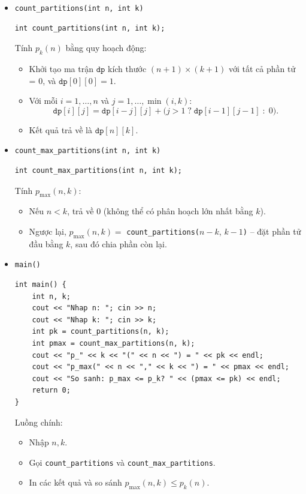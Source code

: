 \documentclass[a4paper,12pt]{article}
\begin{document}
\begin{itemize}

  \item \texttt{count\_partitions(int n, int k)}  
    \begin{lstlisting}[style=cppstyle]
int count_partitions(int n, int k);
    \end{lstlisting}
    Tính \(p_k(n)\) bằng quy hoạch động:
    \begin{itemize}
      \item Khởi tạo ma trận \(\texttt{dp}\) kích thước \((n+1)\times(k+1)\) với tất cả phần tử = 0, và \(\texttt{dp}[0][0]=1\).  
      \item Với mỗi \(i=1,\dots,n\) và \(j=1,\dots,\min(i,k)\):
        \[
          \texttt{dp}[i][j]
            = \texttt{dp}[i-j][j]
            + \bigl(j>1\;?\;\texttt{dp}[i-1][j-1]\;:\;0\bigr).
        \]
      \item Kết quả trả về là \(\texttt{dp}[n][k]\).
    \end{itemize}

  \item \texttt{count\_max\_partitions(int n, int k)}  
    \begin{lstlisting}[style=cppstyle]
int count_max_partitions(int n, int k);
    \end{lstlisting}
    Tính \(p_{\max}(n,k)\):
    \begin{itemize}
      \item Nếu \(n<k\), trả về 0 (không thể có phân hoạch lớn nhất bằng \(k\)).  
      \item Ngược lại, \(p_{\max}(n,k)=\) \texttt{count\_partitions(}\(n-k\), \(k-1\)\texttt{)} – đặt phần tử đầu bằng \(k\), sau đó chia phần còn lại.
    \end{itemize}

  \item \texttt{main()}  
    \begin{lstlisting}[style=cppstyle]
int main() {
    int n, k;
    cout << "Nhap n: "; cin >> n;
    cout << "Nhap k: "; cin >> k;
    int pk = count_partitions(n, k);
    int pmax = count_max_partitions(n, k);
    cout << "p_" << k << "(" << n << ") = " << pk << endl;
    cout << "p_max(" << n << "," << k << ") = " << pmax << endl;
    cout << "So sanh: p_max <= p_k? " << (pmax <= pk) << endl;
    return 0;
}
    \end{lstlisting}
    Luồng chính:
    \begin{itemize}
      \item Nhập \(n, k\).  
      \item Gọi \texttt{count\_partitions} và \texttt{count\_max\_partitions}.  
      \item In các kết quả và so sánh \(p_{\max}(n,k)\le p_k(n)\).
    \end{itemize}

\end{itemize}
\end{document}
